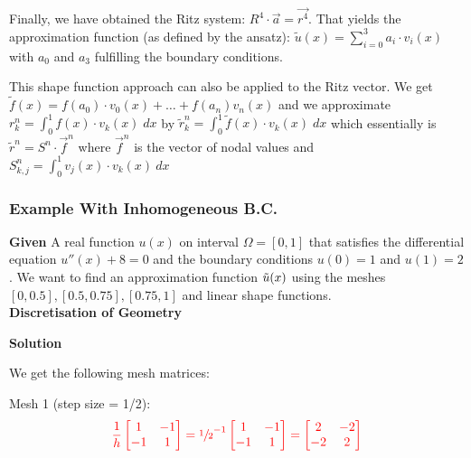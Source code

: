 Finally, we have obtained the Ritz system: $R^4\cdot\vec{a}=\vec{r^4}$.
That yields the approximation function (as defined by the ansatz): $\tilde{u}(x)=\sum_{i=0}^3 a_i\cdot v_i(x)$
with $a_0$ and $a_3$ fulfilling the boundary conditions.

This shape function approach can also be applied to the Ritz vector.
We get $\tilde{f}(x) = f(a_0)\cdot v_0(x)+\ldots+f(a_n)v_n(x)$ and we approximate 
$r_{k}^{n}=\int_{0}^{1}f(x)\cdot v_{k}(x)\;dx$ by $\tilde{r}_{k}^{n}=\int_{0}^{1}\tilde{f}(x)\cdot v_{k}(x)\;dx$
which essentially is $\tilde{r}^n = S^n \cdot \vec{f}^n$ where $\vec{f}^n$ is the vector of nodal values
and $S_{k,j}^n=\int_0^1 v_j(x)\cdot v_k(x)\ dx$

\subsubsection{Example With Inhomogeneous B.C.}

\textbf{Given} A real function $u(x)$ on interval $\Omega=[0,1]$ that satisfies the differential equation $u''(x) + 8 = 0$
and the boundary conditions $u(0) = 1$ and $u(1) = 2$. We want to find an approximation function $\tilde{u}(x)$ using the meshes
$[0, 0.5], [0.5, 0.75], [0.75, 1]$ and linear shape functions.
\\[1em]
\textbf{Discretisation of Geometry}

\textbf{Solution}

We get the following mesh matrices:

Mesh 1 (step size = 1/2):
\begin{align*}
    {\color{red}
    \frac{1}{h}\begin{bmatrix}
        1 & -1 \\
        -1 & 1
    \end{bmatrix}
    = \sfrac{1}{2}^{-1} \begin{bmatrix}
        1 & -1 \\
        -1 & 1
    \end{bmatrix}
    =
    \begin{bmatrix}
        2 & -2 \\
        -2 & 2
    \end{bmatrix}
    }
\end{align*}

